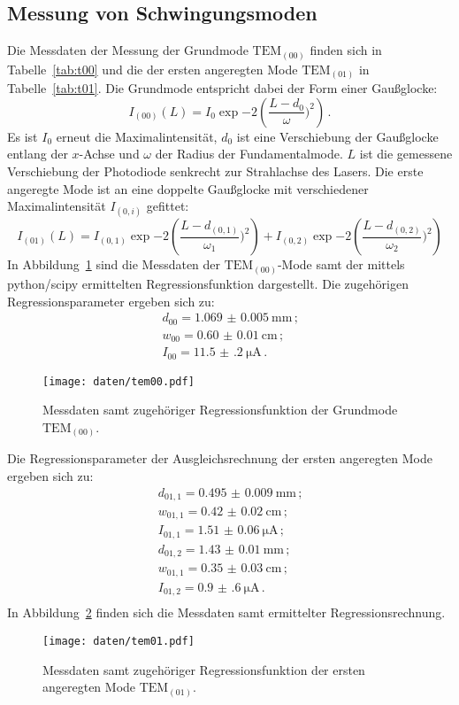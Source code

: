 \subsection{Messung von Schwingungsmoden}
Die Messdaten der Messung der Grundmode $\text{TEM}_{(00)}$ finden sich in Tabelle~\ref{tab:t00} und die der ersten angeregten Mode $\text{TEM}_{(01)}$ in Tabelle~\ref{tab:t01}.
Die Grundmode entspricht dabei der Form einer Gaußglocke:
\begin{equation}
  I_{(00)}(L)=I_0 \exp{-2\left(\frac{L-d_0}{\omega})^2\right)}\,\text{.}
\end{equation}
Es ist $I_0$ erneut die Maximalintensität, $d_0$ ist eine Verschiebung der Gaußglocke entlang der $x$-Achse und $\omega$ der Radius der Fundamentalmode. $L$ ist die gemessene Verschiebung der Photodiode senkrecht zur Strahlachse des Lasers.
Die erste angeregte Mode ist an eine doppelte Gaußglocke mit verschiedener Maximalintensität $I_{(0,i)}$ gefittet:
\begin{equation}
    I_{(01)}(L)=I_{(0,1)} \exp{-2\left(\frac{L-d_{(0,1)}}{\omega_1})^2\right)}+I_{(0,2)} \exp{-2\left(\frac{L-d_{(0,2)}}{\omega_2})^2\right)}
\end{equation}
In Abbildung~\ref{fig:tem00} sind die Messdaten der $\text{TEM}_{(00)}$-Mode samt der mittels python/scipy ermittelten Regressionsfunktion dargestellt.
Die zugehörigen Regressionsparameter ergeben sich zu:
\begin{align}
  d_{00}=\SI{1.069(5)}{\milli\meter}\,\text{;}\\ w_{00}=\SI{0.60(1)}{\centi\meter}\,\text{;}\\ I_{00}=\SI{11.5(2)}{\micro\ampere}\,\text{.}
\end{align}
\begin{figure}
  \centering
  \texttt{[image: daten/tem00.pdf]}
  \caption{Messdaten samt zugehöriger Regressionsfunktion der Grundmode $\text{TEM}_{(00)}$.}
  \label{fig:tem00}
\end{figure}


Die Regressionsparameter der Ausgleichsrechnung der ersten angeregten Mode ergeben sich zu:
\begin{align}
  d_{01,1}=\SI{0.495(9)}{\milli\meter}\,\text{;}\\
  w_{01,1}=\SI{0.42(2)}{\centi\meter} \,\text{;}\\
  I_{01,1}=\SI{1.51(6)}{\micro\ampere}\,\text{;}\\
  d_{01,2}=\SI{1.43(1)}{\milli\meter} \,\text{;}\\
  w_{01,1}=\SI{0.35(3)}{\centi\meter} \,\text{;}\\
  I_{01,2}=\SI{0.9(6)}{\micro\ampere}\,\text{.}\\
\end{align}
In Abbildung~\ref{fig:tem01} finden sich die Messdaten samt ermittelter Regressionsrechnung.
\begin{figure}
  \centering
  \texttt{[image: daten/tem01.pdf]}
  \caption{Messdaten samt zugehöriger Regressionsfunktion der ersten angeregten Mode $\text{TEM}_{(01)}$.}
  \label{fig:tem01}
\end{figure}

